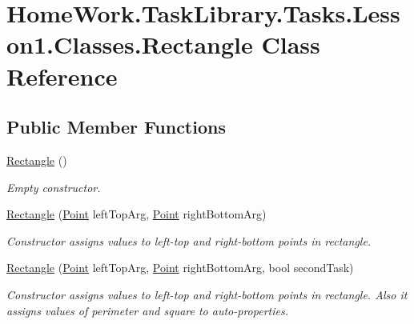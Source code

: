 \hypertarget{class_home_work_1_1_task_library_1_1_tasks_1_1_lesson1_1_1_classes_1_1_rectangle}{}\section{Home\+Work.\+Task\+Library.\+Tasks.\+Lesson1.\+Classes.\+Rectangle Class Reference}
\label{class_home_work_1_1_task_library_1_1_tasks_1_1_lesson1_1_1_classes_1_1_rectangle}
\subsection*{Public Member Functions}
\begin{DoxyCompactItemize}
\item 
\mbox{\hyperlink{class_home_work_1_1_task_library_1_1_tasks_1_1_lesson1_1_1_classes_1_1_rectangle_a2528ed8b6229a69e75df312f5f578df1}{Rectangle}} ()
\begin{DoxyCompactList}\small\item\em Empty constructor. \end{DoxyCompactList}\item 
\mbox{\hyperlink{class_home_work_1_1_task_library_1_1_tasks_1_1_lesson1_1_1_classes_1_1_rectangle_a1e3b31ce9d2cbb573b070459412b23ce}{Rectangle}} (\mbox{\hyperlink{struct_home_work_1_1_task_library_1_1_tasks_1_1_lesson1_1_1_classes_1_1_point}{Point}} left\+Top\+Arg, \mbox{\hyperlink{struct_home_work_1_1_task_library_1_1_tasks_1_1_lesson1_1_1_classes_1_1_point}{Point}} right\+Bottom\+Arg)
\begin{DoxyCompactList}\small\item\em Constructor assigns values to left-\/top and right-\/bottom points in rectangle. \end{DoxyCompactList}\item 
\mbox{\hyperlink{class_home_work_1_1_task_library_1_1_tasks_1_1_lesson1_1_1_classes_1_1_rectangle_ab482dd91f320848febcc0fb0f64ad1de}{Rectangle}} (\mbox{\hyperlink{struct_home_work_1_1_task_library_1_1_tasks_1_1_lesson1_1_1_classes_1_1_point}{Point}} left\+Top\+Arg, \mbox{\hyperlink{struct_home_work_1_1_task_library_1_1_tasks_1_1_lesson1_1_1_classes_1_1_point}{Point}} right\+Bottom\+Arg, bool second\+Task)
\begin{DoxyCompactList}\small\item\em Constructor assigns values to left-\/top and right-\/bottom points in rectangle. Also it assigns values of perimeter and square to auto-\/properties. \end{DoxyCompactList}\item 

\end{DoxyCompactItemize}

